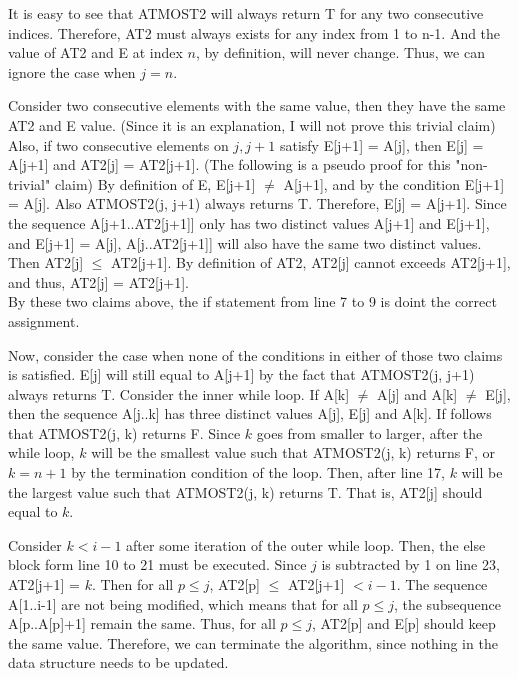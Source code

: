 \documentclass[10pt]{article}
\begin{document}
\begin{enumerate}[a.]
		It is easy to see that ATMOST2 will always return T for any two
		consecutive indices.
		Therefore, AT2 must always exists for any index from 1 to n-1. 
		And the value of AT2 and E at index $n$, by definition, will never change. 
		Thus, we can ignore the case when $j = n$.

		Consider two consecutive elements with the same value, then they have
		the same AT2 and E value.
		(Since it is an explanation, I will not prove this trivial claim) 
		Also, if two consecutive elements on $j, j+1$ satisfy E[j+1] =
		A[j], then E[j] = A[j+1] and AT2[j] = AT2[j+1]. 
		(The following is a pseudo proof for this "non-trivial" claim)
		By definition of E, E[j+1] $\neq$ A[j+1], and by the condition E[j+1] =
		A[j]. 
		Also ATMOST2(j, j+1) always returns T. 
		Therefore, E[j] = A[j+1].
		Since the sequence A[j+1..AT2[j+1]] only has two distinct values A[j+1]
		and E[j+1], and E[j+1] = A[j], A[j..AT2[j+1]] will also have the same
		two distinct values.
		Then AT2[j] $\leq$ AT2[j+1].
		By definition of AT2, AT2[j] cannot exceeds AT2[j+1], and thus, AT2[j]
		= AT2[j+1]. \\
		By these two claims above, the if statement from line 7 to 9 is doint the correct assignment. 

		Now, consider the case when none of the conditions in either of those two claims is
		satisfied. 
		E[j] will still equal to A[j+1] by the fact that ATMOST2(j, j+1) always
		returns T.
		Consider the inner while loop. 
		If A[k] $\neq$ A[j] and A[k] $\neq$ E[j], then the sequence A[j..k] has
		three distinct values A[j], E[j] and A[k]. 
		If follows that ATMOST2(j, k) returns F.
		Since $k$ goes from smaller to larger, after the while loop, $k$ will
		be the smallest value such that ATMOST2(j, k) returns F, or $k = n+1$
		by the termination condition of the loop. 
		Then, after line 17, $k$ will be the largest value such that ATMOST2(j,
		k) returns T.
		That is, AT2[j] should equal to $k$.

		Consider $k < i-1$ after some iteration of the outer while loop. 
		Then, the else block form line 10 to 21 must be executed.
		Since $j$ is subtracted by 1 on line 23, AT2[j+1] = $k$.
		Then for all $p \leq j$, AT2[p] $\leq$ AT2[j+1] $< i-1$. 
		The sequence A[1..i-1] are not being modified, which means that for all
		$p \leq j$, the subsequence A[p..A[p]+1] remain the same.
		Thus, for all $p \leq j$, AT2[p] and E[p] should keep the same value. 
		Therefore, we can terminate the algorithm, since nothing in the data
		structure needs to be updated.


\end{enumerate}
\end{document}
